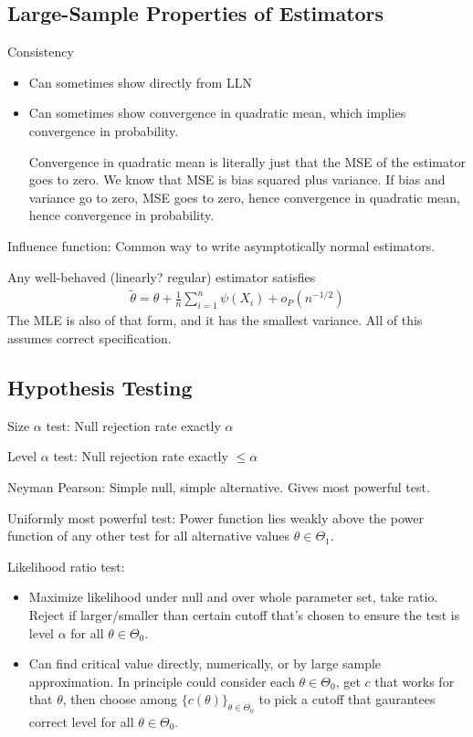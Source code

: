 \documentclass[12pt]{article}
\theoremstyle{plain}
\theoremstyle{definition}
\theoremstyle{remark}
\newcommand{\sumin}{\sum^n_{i=1}}
\begin{document}
\subsection{Large-Sample Properties of Estimators}

Consistency
\begin{itemize}
  \item Can sometimes show directly from LLN
  \item Can sometimes show convergence in quadratic mean, which implies
    convergence in probability.

    Convergence in quadratic mean is literally just that the MSE of the
    estimator goes to zero.
    We know that MSE is bias squared plus variance.
    If bias and variance go to zero, MSE goes to zero, hence convergence
    in quadratic mean, hence convergence in probability.
\end{itemize}
Influence function:
Common way to write asymptotically normal estimators.


Any well-behaved (linearly? regular) estimator satisfies
\begin{align*}
  \tilde{\theta}
  =
  \theta
  +
  \frac{1}{n}
  \sumin
  \psi(X_i)
  +
  o_P(n^{-1/2})
\end{align*}
The MLE is also of that form, and it has the smallest variance.
All of this assumes correct specification.



\subsection{Hypothesis Testing}

Size $\alpha$ test: Null rejection rate exactly $\alpha$

Level $\alpha$ test: Null rejection rate exactly $\leq \alpha$

Neyman Pearson: Simple null, simple alternative.
Gives most powerful test.

Uniformly most powerful test: Power function lies weakly above the power
function of any other test for all alternative values
$\theta\in\Theta_1$.

Likelihood ratio test:
\begin{itemize}
  \item Maximize likelihood under null and over whole parameter set,
    take ratio. Reject if larger/smaller than certain cutoff that's
    chosen to ensure the test is level $\alpha$ for all
    $\theta\in\Theta_0$.
  \item Can find critical value directly, numerically, or by large
    sample approximation.
    In principle could consider each $\theta\in\Theta_0$, get $c$ that
    works for that $\theta$, then choose among
    $\{c(\theta)\}_{\theta\in\Theta_0}$ to pick a cutoff that gaurantees
    correct level for all $\theta\in\Theta_0$.
\end{itemize}
\end{document}
